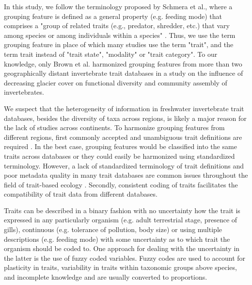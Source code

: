 \documentclass{article}
\begin{document}
In this study, we follow the terminology proposed by Schmera et al., where a grouping feature is defined as a general property (e.g. feeding mode) that comprises a "group of related traits (e.g., predator, shredder, etc.) that vary among species or among individuals within a species" \cite{schmera_proposed_2015}. Thus, we use the term grouping feature in place of which many studies use the term "trait", and the term trait instead of "trait state", "modality" or "trait category". 
To our knowledge, only Brown et al. \cite{brown_functional_2018} harmonized grouping features from more than two geographically distant invertebrate trait databases in a study on the influence of decreasing glacier cover on functional diversity and community assembly of invertebrates. 

We suspect that the heterogeneity of information in freshwater invertebrate trait databases, besides the diversity of taxa across regions, is likely a major reason for the lack of studies across continents. To harmonize grouping features from different regions, first commonly accepted and unambiguous trait definitions are required \cite{schneider_towards_2019}. In the best case, grouping features would be classified into the same traits across databases or they could easily be harmonized using standardized terminology. However, a lack of standardized terminology of trait definitions and poor metadata quality in many trait databases are common issues throughout the field of trait-based ecology \cite{baird_toward_2011, schneider_towards_2019}. Secondly, consistent coding of traits facilitates the compatibility of trait data from different databases. 

Traits can be described in a binary fashion with no uncertainty how the trait is expressed in any particularly organism (e.g. adult terrestrial stage, presence of gills), continuous (e.g. tolerance of pollution, body size) or using multiple descriptions (e.g. feeding mode) with some uncertainty as to which trait the organism should be coded to. One approach for dealing with the uncertainty in the latter is the use of fuzzy coded variables. Fuzzy codes are used to account for plasticity in traits, variability in traits within taxonomic groups above species, and incomplete knowledge and are usually converted to proportions.
\end{document}
